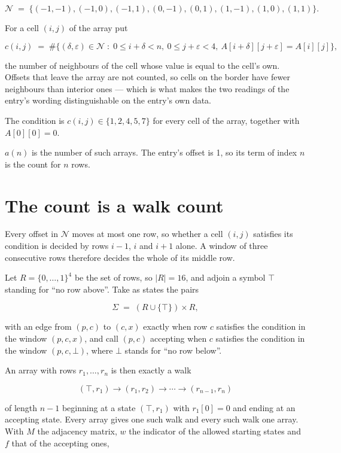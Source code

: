 \documentclass[11pt]{article}
\theoremstyle{definition}
\begin{document}
\[\mathcal{N} \;=\; \{(-1,-1), (-1,0), (-1,1), (0,-1), (0,1), (1,-1), (1,0), (1,1)\}.\]

For a cell $(i,j)$ of the array put

\[c(i,j) \;=\; \#\bigl\{(\delta,\varepsilon)\in\mathcal{N} \;:\; 0\le i+\delta<n,\ 0\le j+\varepsilon<4,\ A[i+\delta][j+\varepsilon] = A[i][j]\bigr\},\]

the number of neighbours of the cell whose value is equal to the cell's own. Offsets that leave the array are not counted, so cells on the border have fewer neighbours than interior ones --- which is what makes the two readings of the entry's wording distinguishable on the entry's own data.

The condition is $c(i,j) \in \{1, 2, 4, 5, 7\}$ for every cell of the array, together with $A[0][0]=0$.

$a(n)$ is the number of such arrays. The entry's offset is 1, so its term of index $n$ is the count for $n$ rows.

\section{The count is a walk count}

Every offset in $\mathcal{N}$ moves at most one row, so whether a cell $(i,j)$ satisfies its condition is decided by rows $i-1$, $i$ and $i+1$ alone. A window of three consecutive rows therefore decides the whole of its middle row.

Let $R = \{0,\dots,1\}^{4}$ be the set of rows, so $|R| = 16$, and adjoin a symbol $\top$ standing for ``no row above''. Take as states the pairs

\[\Sigma \;=\; (R \cup \{\top\}) \times R,\]

with an edge from $(p,c)$ to $(c,x)$ exactly when row $c$ satisfies the condition in the window $(p,c,x)$, and call $(p,c)$ accepting when $c$ satisfies the condition in the window $(p,c,\bot)$, where $\bot$ stands for ``no row below''.

An array with rows $r_1,\dots,r_n$ is then exactly a walk

\[(\top,r_1) \to (r_1,r_2) \to \cdots \to (r_{n-1},r_n)\]

of length $n-1$ beginning at a state $(\top,r_1)$ with $r_1[0]=0$ and ending at an accepting state. Every array gives one such walk and every such walk one array. With $M$ the adjacency matrix, $w$ the indicator of the allowed starting states and $f$ that of the accepting ones,
\end{document}

